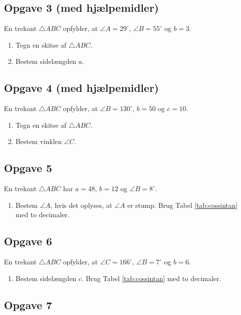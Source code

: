 \subsection*{Opgave 3 (med hjælpemidler)}
En trekant $\triangle ABC$ opfylder, at $\angle A = 29^\circ$, $\angle B = 55^\circ$ og $b = 3$.
\begin{enumerate}[label=\roman*)]
	\item Tegn en skitse af $\triangle ABC$. 
	\item Bestem sidelængden $a$.
\end{enumerate}

\subsection*{Opgave 4 (med hjælpemidler)}
En trekant $\triangle ABC$ opfylder, at $\angle B = 130^\circ$, $b = 50$ og $c = 10$.
\begin{enumerate}[label=\roman*)	]
	\item Tegn en skitse af $\triangle ABC$. 
	\item Bestem vinklen $\angle C$. 
\end{enumerate}

\subsection*{Opgave 5}
En trekant $\triangle ABC$ har $a = 48$, $b = 12$ og $\angle B = 8^\circ$.
\begin{enumerate}[label=\roman*)]
	\item Bestem $\angle A$, hvis det oplyses, at $\angle A$ er stump. Brug Tabel \ref{tab:cossintan} med to 
	decimaler. 
\end{enumerate}

\subsection*{Opgave 6}
En trekant $\triangle ABC$ opfylder, at $\angle C = 166^\circ$, $\angle B = 7^\circ$ og $b = 6$.
\begin{enumerate}[label=\roman*)]
	\item Bestem sidelængden $c$. Brug Tabel \ref{tab:cossintan} med to 
	decimaler. 
\end{enumerate}

\subsection*{Opgave 7}

